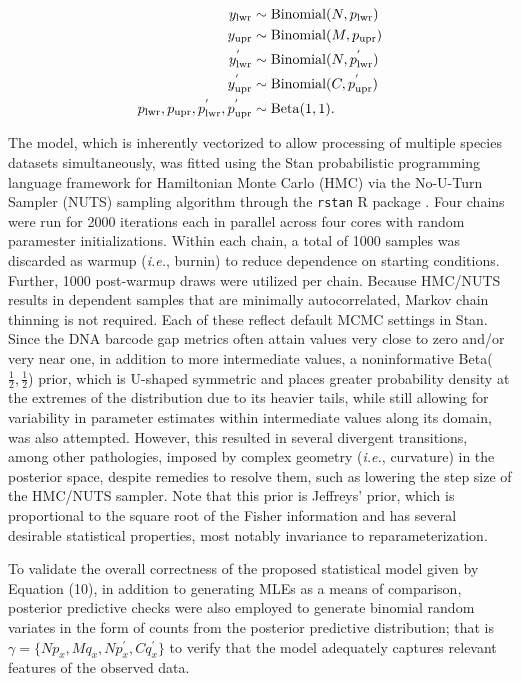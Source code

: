 \documentclass[12pt]{article}
\begin{document}
\begin{align}
\notag y_\mathrm{lwr} &\sim \mathrm{Binomial}(N, p_\mathrm{lwr}) \\ 
\notag y_\mathrm{upr} &\sim \mathrm{Binomial}(M, p_\mathrm{upr}) \\ 
y^{'}_\mathrm{lwr} &\sim \mathrm{Binomial}(N, p^{'}_\mathrm{lwr}) \\ 
 \notag y^{'}_\mathrm{upr} &\sim \mathrm{Binomial}(C, p^{'}_\mathrm{upr}) \\ 
\notag p_\mathrm{lwr}, p_\mathrm{upr}, p^{'}_\mathrm{lwr}, p^{'}_\mathrm{upr}
&\sim \mathrm{Beta}(1, 1).
\end{align}

The model, which is inherently vectorized to allow processing of multiple species datasets simultaneously, was fitted using the Stan probabilistic programming language  \citep{carpenter2017stan} framework for Hamiltonian Monte Carlo (HMC) via the No-U-Turn Sampler (NUTS) sampling algorithm \citep{hoffman2014no} through the {\tt rstan} R package \citep{stan2023rstan}. Four chains were run for 2000 iterations each in parallel across four cores with random paramester initializations. Within each chain, a total of 1000 samples was discarded as warmup (\textit{i.e.}, burnin) to reduce dependence on starting conditions. Further, 1000 post-warmup draws were utilized per chain. Because HMC/NUTS results in dependent samples that are minimally autocorrelated, Markov chain thinning is not required. Each of these reflect default MCMC settings in Stan. Since the DNA barcode gap metrics often attain values very close to zero and/or very near one, in addition to more intermediate values, a noninformative Beta($\frac{1}{2}, \frac{1}{2}$) prior, which is U-shaped symmetric and places greater probability density at the extremes of the distribution due to its heavier tails, while still allowing for variability in parameter estimates within intermediate values along its domain, was also attempted. However, this resulted in several divergent transitions, among other pathologies, imposed by complex geometry (\textit{i.e.}, curvature) in the posterior space, despite remedies to resolve them, such as lowering the step size of the HMC/NUTS sampler. Note that this prior is Jeffreys' prior, which is proportional to the square root of the Fisher information and has several desirable statistical properties, most notably invariance to reparameterization. 

To validate the overall correctness of the proposed statistical model given by \\ Equation (10), in addition to generating MLEs as a means of comparison, posterior predictive checks were also employed to generate binomial random variates in the form of counts from the posterior predictive distribution; that is $\gamma = \{Np_x, Mq_x, Np^{'}_x, Cq^{'}_x\}$ to verify that the model adequately captures relevant features of the observed data.
\end{document}
